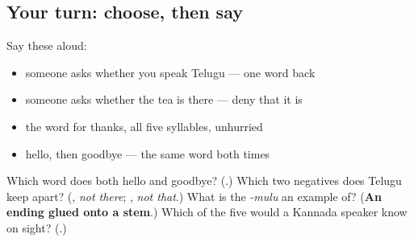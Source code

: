 \subsection*{Your turn: choose, then say}
Say these aloud:

\begin{itemize}
\raggedright
  \item someone asks whether you speak Telugu — one word back
  \item someone asks whether the tea is there — deny that it is
  \item the word for thanks, all five syllables, unhurried
  \item hello, then goodbye — the same word both times
\end{itemize}

\begin{tcolorbox}[breakable,colback=teal!4,colframe=teal!35!black,title={Before you move on}]
Which word does both hello and goodbye? (\textbf{}.) Which two negatives does Telugu keep apart? (\textbf{}, \emph{not there}; \textbf{}, \emph{not that}.) What is the \emph{-mulu} an example of? (\textbf{An ending glued onto a stem}.) Which of the five would a Kannada speaker know on sight? (\textbf{}.)
\end{tcolorbox}
